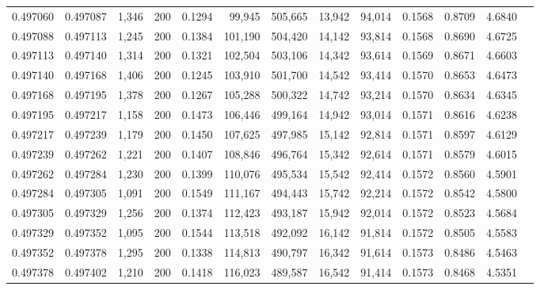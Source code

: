 \begin{tabular}{rrrrrrrrrrrrr}
0.497060 & 0.497087 & 1,346 & 200 &                                     0.1294 &  99,945 & 505,665 &  13,942 &  94,014 & 0.1568 & 0.8709 & 4.6840 \\
0.497088 & 0.497113 & 1,245 & 200 &                                     0.1384 & 101,190 & 504,420 &  14,142 &  93,814 & 0.1568 & 0.8690 & 4.6725 \\
0.497113 & 0.497140 & 1,314 & 200 &                                     0.1321 & 102,504 & 503,106 &  14,342 &  93,614 & 0.1569 & 0.8671 & 4.6603 \\
0.497140 & 0.497168 & 1,406 & 200 &                                     0.1245 & 103,910 & 501,700 &  14,542 &  93,414 & 0.1570 & 0.8653 & 4.6473 \\
0.497168 & 0.497195 & 1,378 & 200 &                                     0.1267 & 105,288 & 500,322 &  14,742 &  93,214 & 0.1570 & 0.8634 & 4.6345 \\
0.497195 & 0.497217 & 1,158 & 200 &                                     0.1473 & 106,446 & 499,164 &  14,942 &  93,014 & 0.1571 & 0.8616 & 4.6238 \\
0.497217 & 0.497239 & 1,179 & 200 &                                     0.1450 & 107,625 & 497,985 &  15,142 &  92,814 & 0.1571 & 0.8597 & 4.6129 \\
0.497239 & 0.497262 & 1,221 & 200 &                                     0.1407 & 108,846 & 496,764 &  15,342 &  92,614 & 0.1571 & 0.8579 & 4.6015 \\
0.497262 & 0.497284 & 1,230 & 200 &                                     0.1399 & 110,076 & 495,534 &  15,542 &  92,414 & 0.1572 & 0.8560 & 4.5901 \\
0.497284 & 0.497305 & 1,091 & 200 &                                     0.1549 & 111,167 & 494,443 &  15,742 &  92,214 & 0.1572 & 0.8542 & 4.5800 \\
0.497305 & 0.497329 & 1,256 & 200 &                                     0.1374 & 112,423 & 493,187 &  15,942 &  92,014 & 0.1572 & 0.8523 & 4.5684 \\
0.497329 & 0.497352 & 1,095 & 200 &                                     0.1544 & 113,518 & 492,092 &  16,142 &  91,814 & 0.1572 & 0.8505 & 4.5583 \\
0.497352 & 0.497378 & 1,295 & 200 &                                     0.1338 & 114,813 & 490,797 &  16,342 &  91,614 & 0.1573 & 0.8486 & 4.5463 \\
0.497378 & 0.497402 & 1,210 & 200 &                                     0.1418 & 116,023 & 489,587 &  16,542 &  91,414 & 0.1573 & 0.8468 & 4.5351 \\

\end{tabular}

